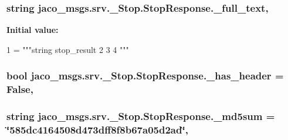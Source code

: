 \subsubsection[{\texorpdfstring{\+\_\+full\+\_\+text}{_full_text}}]{\setlength{\rightskip}{0pt plus 5cm}string jaco\+\_\+msgs.\+srv.\+\_\+\+Stop.\+Stop\+Response.\+\_\+full\+\_\+text\hspace{0.3cm}{\ttfamily [static]}, {\ttfamily [private]}}\hypertarget{classjaco__msgs_1_1srv_1_1__Stop_1_1StopResponse_ac8863c97bcb6456518b562765aa3229a}{}\label{classjaco__msgs_1_1srv_1_1__Stop_1_1StopResponse_ac8863c97bcb6456518b562765aa3229a}
{\bfseries Initial value\+:}
\begin{DoxyCode}
1 = \textcolor{stringliteral}{"""string stop\_result}
2 \textcolor{stringliteral}{}
3 \textcolor{stringliteral}{}
4 \textcolor{stringliteral}{"""}
\end{DoxyCode}
\subsubsection[{\texorpdfstring{\+\_\+has\+\_\+header}{_has_header}}]{\setlength{\rightskip}{0pt plus 5cm}bool jaco\+\_\+msgs.\+srv.\+\_\+\+Stop.\+Stop\+Response.\+\_\+has\+\_\+header = False\hspace{0.3cm}{\ttfamily [static]}, {\ttfamily [private]}}\hypertarget{classjaco__msgs_1_1srv_1_1__Stop_1_1StopResponse_a132c6a734ba699fbbfdf360395845fbd}{}\label{classjaco__msgs_1_1srv_1_1__Stop_1_1StopResponse_a132c6a734ba699fbbfdf360395845fbd}
\subsubsection[{\texorpdfstring{\+\_\+md5sum}{_md5sum}}]{\setlength{\rightskip}{0pt plus 5cm}string jaco\+\_\+msgs.\+srv.\+\_\+\+Stop.\+Stop\+Response.\+\_\+md5sum = \char`\"{}585dc4164508d473dff8f8b67a05d2ad\char`\"{}\hspace{0.3cm}{\ttfamily [static]}, {\ttfamily [private]}}\hypertarget{classjaco__msgs_1_1srv_1_1__Stop_1_1StopResponse_a59f34d582a9200b9a18e987e67ffea91}{}\label{classjaco__msgs_1_1srv_1_1__Stop_1_1StopResponse_a59f34d582a9200b9a18e987e67ffea91}
